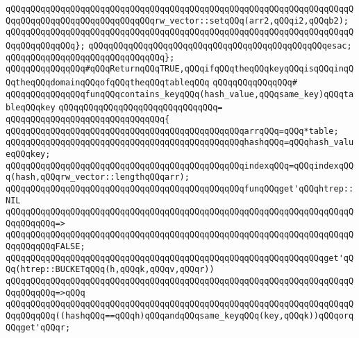 \verb|qQQqqQQqqQQqqQQqqQQqqQQqqQQqqQQqqQQqqQQqqQQqqQQqqQQqqQQqqQQqqQQqqQQqqQQqqQQqqQQqqQQqqQQqqQQqqQQqqQQqrw_vector::setqQQq(arr2,qQQqi2,qQQqb2);|\newline
\verb|qQQqqQQqqQQqqQQqqQQqqQQqqQQqqQQqqQQqqQQqqQQqqQQqqQQqqQQqqQQqqQQqqQQqqQQqqQQqqQQqqQQq};|\newline
\verb|qQQqqQQqqQQqqQQqqQQqqQQqqQQqqQQqqQQqqQQqqQQqqQQqesac;|\newline
\newline
\verb|qQQqqQQqqQQqqQQqqQQqqQQqqQQqqQQq};|\newline
\newline
\verb|qQQqqQQqqQQqqQQq#qQQqReturnqQQqTRUE,qQQqifqQQqtheqQQqkeyqQQqisqQQqinqQQqtheqQQqdomainqQQqofqQQqtheqQQqtableqQQq|\newline
\verb|qQQqqQQqqQQqqQQq#|\newline
\verb|qQQqqQQqqQQqqQQqfunqQQqcontains_keyqQQq(hash_value,qQQqsame_key)qQQqtableqQQqkey|\newline
\verb|qQQqqQQqqQQqqQQqqQQqqQQqqQQqqQQq=|\newline
\verb|qQQqqQQqqQQqqQQqqQQqqQQqqQQqqQQq{|\newline
\verb|qQQqqQQqqQQqqQQqqQQqqQQqqQQqqQQqqQQqqQQqqQQqqQQqarrqQQq=qQQq*table;|\newline
\verb|qQQqqQQqqQQqqQQqqQQqqQQqqQQqqQQqqQQqqQQqqQQqqQQqhashqQQq=qQQqhash_valueqQQqkey;|\newline
\verb|qQQqqQQqqQQqqQQqqQQqqQQqqQQqqQQqqQQqqQQqqQQqqQQqindexqQQq=qQQqindexqQQq(hash,qQQqrw_vector::lengthqQQqarr);|\newline
\newline
\verb|qQQqqQQqqQQqqQQqqQQqqQQqqQQqqQQqqQQqqQQqqQQqqQQqfunqQQqget'qQQqhtrep::NIL|\newline
\verb|qQQqqQQqqQQqqQQqqQQqqQQqqQQqqQQqqQQqqQQqqQQqqQQqqQQqqQQqqQQqqQQqqQQqqQQqqQQqqQQq=>|\newline
\verb|qQQqqQQqqQQqqQQqqQQqqQQqqQQqqQQqqQQqqQQqqQQqqQQqqQQqqQQqqQQqqQQqqQQqqQQqqQQqqQQqFALSE;|\newline
\newline
\verb|qQQqqQQqqQQqqQQqqQQqqQQqqQQqqQQqqQQqqQQqqQQqqQQqqQQqqQQqqQQqqQQqget'qQQq(htrep::BUCKETqQQq(h,qQQqk,qQQqv,qQQqr))|\newline
\verb|qQQqqQQqqQQqqQQqqQQqqQQqqQQqqQQqqQQqqQQqqQQqqQQqqQQqqQQqqQQqqQQqqQQqqQQqqQQqqQQq=>qQQq|\newline
\verb|qQQqqQQqqQQqqQQqqQQqqQQqqQQqqQQqqQQqqQQqqQQqqQQqqQQqqQQqqQQqqQQqqQQqqQQqqQQqqQQq((hashqQQq==qQQqh)qQQqandqQQqsame_keyqQQq(key,qQQqk))qQQqorqQQqget'qQQqr;|\newline
